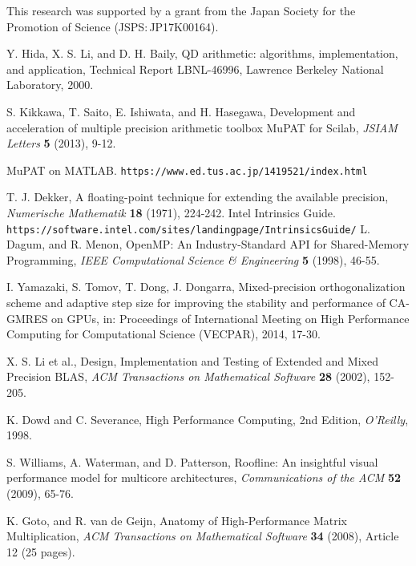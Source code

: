 \documentclass{IOS-Book-Article}
\begin{document}
This research was supported by a grant from the Japan Society for the Promotion of Science (JSPS$\colon$JP17K00164).
\begin{thebibliography}{99}
 Y. Hida, X. S. Li, and D. H. Baily, QD arithmetic: algorithms, implementation, and application, Technical Report LBNL-46996, Lawrence Berkeley National Laboratory, 2000.

 S. Kikkawa, T. Saito, E. Ishiwata, and H. Hasegawa, Development and acceleration of multiple precision arithmetic toolbox MuPAT for Scilab, {\it JSIAM Letters} {\bf 5} (2013), 9-12. 

 MuPAT on MATLAB. {\tt https://www.ed.tus.ac.jp/1419521/index.html}

 T. J. Dekker, A floating-point technique for extending the available precision, {\it Numerische Mathematik} {\bf 18} (1971), 224-242. 
 Intel Intrinsics Guide. {\tt https://software.intel.com/sites/landingpage/IntrinsicsGuide/}
 L. Dagum, and R. Menon, OpenMP: An Industry-Standard API for Shared-Memory Programming, {\it IEEE Computational Science \& Engineering} {\bf 5} (1998), 46-55. 

I. Yamazaki, S. Tomov, T. Dong, J. Dongarra, Mixed-precision orthogonalization scheme and adaptive step size for improving the stability and performance of CA-GMRES on GPUs, in: Proceedings of International Meeting on High Performance Computing for Computational Science (VECPAR), 2014, 17-30.

 X. S. Li et al., Design, Implementation and Testing of Extended and Mixed Precision BLAS, {\it ACM Transactions on Mathematical Software} {\bf 28} (2002), 152-205.

 K. Dowd and C. Severance, High Performance Computing, 2nd Edition, {\it O'Reilly}, 1998.

 S. Williams, A. Waterman, and D. Patterson, Roofline: An insightful visual performance model for multicore architectures, {\it Communications of the ACM} {\bf 52} (2009),  65-76.

 K. Goto, and R. van de Geijn, Anatomy of High-Performance Matrix Multiplication, {\it ACM Transactions on Mathematical Software} {\bf 34} (2008), Article 12 (25 pages).

\end{thebibliography}
\end{document}

